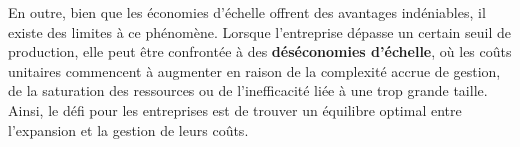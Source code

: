 \documentclass[a4paper,12pt]{article}
\begin{document}
En outre, bien que les économies d’échelle offrent des avantages indéniables,
il existe des limites à ce phénomène. Lorsque l’entreprise dépasse un certain
seuil de production, elle peut être confrontée à des \textbf{déséconomies
  d’échelle}, où les coûts unitaires commencent à augmenter en raison de la
complexité accrue de gestion, de la saturation des ressources ou de
l’inefficacité liée à une trop grande taille. Ainsi, le défi pour les
entreprises est de trouver un équilibre optimal entre l'expansion et la gestion
de leurs coûts.
\end{document}
